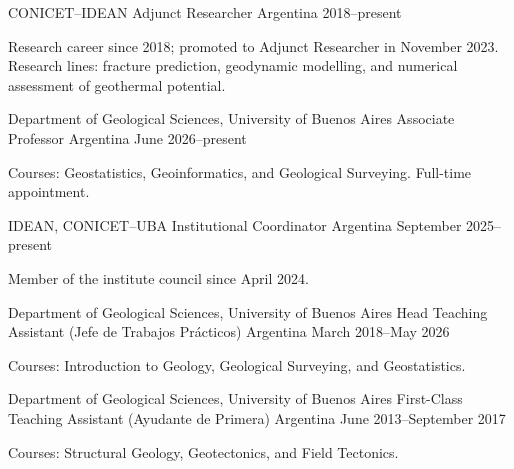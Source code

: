 

\begin{cventries}

\cventry
    {CONICET--IDEAN}
    {Adjunct Researcher}
    {Argentina}
    {2018--present}
    {
      \begin{cvitems}
        \item {Research career since 2018; promoted to Adjunct Researcher in November 2023. Research lines: fracture prediction, geodynamic modelling, and numerical assessment of geothermal potential.}
      \end{cvitems}
    }

\cventry
    {Department of Geological Sciences, University of Buenos Aires}
    {Associate Professor}
    {Argentina}
    {June 2026--present}
    {
      \begin{cvitems}
        \item {Courses: Geostatistics, Geoinformatics, and Geological Surveying. Full-time appointment.}
      \end{cvitems}
    }

\cventry
    {IDEAN, CONICET--UBA}
    {Institutional Coordinator}
    {Argentina}
    {September 2025--present}
    {
      \begin{cvitems}
        \item {Member of the institute council since April 2024.}
      \end{cvitems}
    }

\end{cventries}


\begin{cventries}

\cventry
    {Department of Geological Sciences, University of Buenos Aires}
    {Head Teaching Assistant (Jefe de Trabajos Prácticos)}
    {Argentina}
    {March 2018--May 2026}
    {
      \begin{cvitems}
        \item {Courses: Introduction to Geology, Geological Surveying, and Geostatistics.}
      \end{cvitems}
    }

\cventry
    {Department of Geological Sciences, University of Buenos Aires}
    {First-Class Teaching Assistant (Ayudante de Primera)}
    {Argentina}
    {June 2013--September 2017}
    {
      \begin{cvitems}
        \item {Courses: Structural Geology, Geotectonics, and Field Tectonics.}
      \end{cvitems}
    }

\end{cventries}


